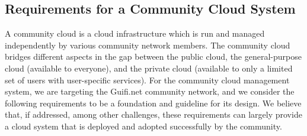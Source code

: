 

\subsection{Requirements for a Community Cloud System}
\label{sec:requirements}

A community cloud is a cloud infrastructure which is run and managed independently by various community network members. The community cloud bridges different aspects in the gap between the public cloud, 
the general-purpose cloud (available to everyone), and the private cloud (available to only a limited set of users with user-specific services). 
For the community cloud management system, we are targeting the Guifi.net community network, and we consider the following requirements to be a foundation and guideline for its design. 
We believe that, if addressed, among other challenges, these requirements can largely provide a cloud system that is deployed and adopted successfully by the community.



